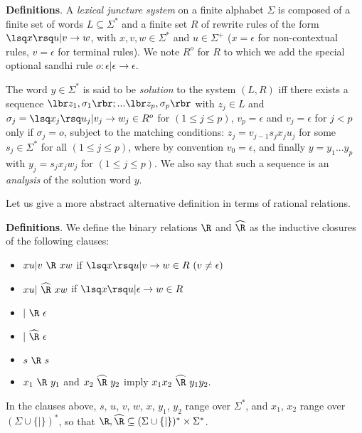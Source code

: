 \noindent
{\bf Definitions}. A {\sl lexical juncture system} on a finite alphabet 
$\Sigma$ is
composed of a finite set of words $L\subseteq \Sigma^*$ 
and a finite set $R$ of rewrite rules of the form 
$\lsq x\rsq u|v\rightarrow w$, with $x,v,w\in\Sigma^*$ and $u\in\Sigma^+$ 
($x=\epsilon$ for non-contextual rules, $v=\epsilon$ for terminal rules). 
We note $R^o$ for $R$ to which we add the special optional sandhi rule 
$o:\epsilon|\epsilon\rightarrow\epsilon$.

The word $y\in\Sigma^*$ is said to be 
{\sl solution} to the system $(L,R)$ iff there exists a sequence
$\lbr z_1,\sigma_1\rbr ;...\lbr z_p,\sigma_p\rbr $ with $z_j\in L$ 
and $\sigma_j=\lsq x_j\rsq u_j|v_j\rightarrow w_j\in R^o$ 
for $(1\leq j\leq p)$, $v_p=\epsilon$ and $v_j=\epsilon$ for $j<p$ only if
$\sigma_j=o$, subject to the matching conditions:
$z_j=v_{j-1} s_j x_j u_j$ for some $s_j\in\Sigma^*$ 
for all $(1\leq j\leq p)$, where by convention $v_0=\epsilon$,  
and finally $y=y_1 ... y_p$ with
$y_j=s_j x_j w_j$ for $(1\leq j\leq p)$.
We also say that such a sequence is an {\sl analysis} of the solution
word $y$.

Let us give a more abstract alternative definition in terms of rational
relations.

\noindent
{\bf Definitions}. 
We define the binary relations $\R$ and $\widehat{\R}$ as the inductive
closures of the following clauses:
\begin{itemize}
\item $xu|v ~{\R}~ xw$ if $\lsq x\rsq u|v\rightarrow w\in R~(v\neq\epsilon)$
\item $xu| ~{\widehat{\R}}~ xw$ if $\lsq x\rsq u|\epsilon\rightarrow w\in R$
\item $|~{\R}~\epsilon$
\item $|~{\widehat{\R}}~\epsilon$
\item $s~{\R}~s$
\item $x_1 ~{\R}~ y_1$ and $x_2 ~\widehat{\R}~ y_2$ imply 
$x_1  x_2 ~\widehat{\R}~ y_1  y_2.$
\end{itemize}

In the clauses above, $s$, $u$, $v$, $w$, $x$, $y_1$, $y_2$
range over $\Sigma^*$, and $x_1$, $x_2$ range over $(\Sigma\cup\{|\})^*$,
so that $\R, \widehat{\R} \subseteq (\Sigma\cup\{|\})^*\times\Sigma^*$. 


